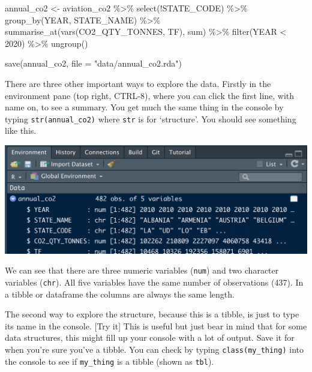 \documentclass[
]{book}
\newenvironment{Shaded}{\begin{snugshade}}{\end{snugshade}}
\newcommand{\AttributeTok}[1]{\textcolor[rgb]{0.77,0.63,0.00}{#1}}
\newcommand{\DecValTok}[1]{\textcolor[rgb]{0.00,0.00,0.81}{#1}}
\newcommand{\FunctionTok}[1]{\textcolor[rgb]{0.00,0.00,0.00}{#1}}
\newcommand{\NormalTok}[1]{#1}
\newcommand{\OtherTok}[1]{\textcolor[rgb]{0.56,0.35,0.01}{#1}}
\newcommand{\SpecialCharTok}[1]{\textcolor[rgb]{0.00,0.00,0.00}{#1}}
\newcommand{\StringTok}[1]{\textcolor[rgb]{0.31,0.60,0.02}{#1}}
\begin{document}
\begin{Shaded}
\begin{Highlighting}[]
\NormalTok{annual\_co2 }\OtherTok{\textless{}{-}}\NormalTok{ aviation\_co2 }\SpecialCharTok{\%\textgreater{}\%}
  \FunctionTok{select}\NormalTok{(}\SpecialCharTok{!}\NormalTok{STATE\_CODE) }\SpecialCharTok{\%\textgreater{}\%} 
  \FunctionTok{group\_by}\NormalTok{(YEAR, STATE\_NAME) }\SpecialCharTok{\%\textgreater{}\%}
  \FunctionTok{summarise\_at}\NormalTok{(}\FunctionTok{vars}\NormalTok{(CO2\_QTY\_TONNES, TF), sum) }\SpecialCharTok{\%\textgreater{}\%}
  \FunctionTok{filter}\NormalTok{(YEAR }\SpecialCharTok{\textless{}} \DecValTok{2020}\NormalTok{) }\SpecialCharTok{\%\textgreater{}\%} 
  \FunctionTok{ungroup}\NormalTok{()}

\FunctionTok{save}\NormalTok{(annual\_co2, }\AttributeTok{file =} \StringTok{"data/annual\_co2.rda"}\NormalTok{)}
\end{Highlighting}
\end{Shaded}

There are three other important ways to explore the data. Firstly in the environment pane (top right, CTRL-8), where you can click the first line, with name on, to see a summary. You get much the same thing in the console by typing \texttt{str(annual\_co2)} where \texttt{str} is for `structure'. You should see something like this.

\includegraphics{images/CO2inEnvironment.png}

We can see that there are three numeric variables (\texttt{num}) and two character variables (\texttt{chr}). All five variables have the same number of observations (437). In a tibble or dataframe the columns are always the same length.

The second way to explore the structure, because this is a tibble, is just to type its name in the console. {[}Try it{]} This is useful but just bear in mind that for some data structures, this might fill up your console with a lot of output. Save it for when you're sure you've a tibble. You can check by typing \texttt{class(my\_thing)} into the console to see if \texttt{my\_thing} is a tibble (shown as \texttt{tbl}).
\end{document}

